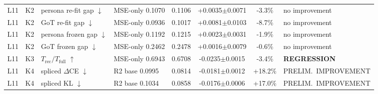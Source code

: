 \begin{table}[t]
\begin{adjustbox}{max width=\linewidth}
\begin{tabular}{llllcccl}
L11 & K2 & persona re-fit gap $\downarrow$ & MSE-only 0.1070 & 0.1106 & +0.0035$\pm$0.0071 & -3.3\% & no improvement \\
L11 & K2 & GoT re-fit gap $\downarrow$ & MSE-only 0.0936 & 0.1017 & +0.0081$\pm$0.0103 & -8.7\% & no improvement \\
L11 & K2 & persona frozen gap $\downarrow$ & MSE-only 0.1192 & 0.1215 & +0.0023$\pm$0.0031 & -1.9\% & no improvement \\
L11 & K2 & GoT frozen gap $\downarrow$ & MSE-only 0.2462 & 0.2478 & +0.0016$\pm$0.0079 & -0.6\% & no improvement \\
L11 & K3 & $T_{\text{rec}}/T_{\text{full}}$ $\uparrow$ & MSE-only 0.6943 & 0.6708 & -0.0235$\pm$0.0015 & -3.4\% & \textbf{REGRESSION} \\
L11 & K4 & spliced $\Delta$CE $\downarrow$ & R2 base 0.0995 & 0.0814 & -0.0181$\pm$0.0012 & +18.2\% & PRELIM.\ IMPROVEMENT \\
L11 & K4 & spliced KL $\downarrow$ & R2 base 0.1034 & 0.0858 & -0.0176$\pm$0.0006 & +17.0\% & PRELIM.\ IMPROVEMENT \\
\bottomrule
\end{tabular}
\end{adjustbox}
\end{table}
